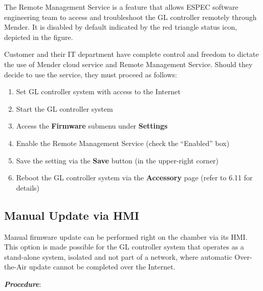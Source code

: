 The Remote Management Service is a feature that allows ESPEC software
engineering team to access and troubleshoot the GL controller remotely
through Mender. It is disabled by default indicated by the red triangle
status icon, depicted in the figure.

Customer and their IT department have complete control and freedom to
dictate the use of Mender cloud service and Remote Management Service.
Should they decide to use the service, they must proceed as follows:

\begin{enumerate}
\def\labelenumi{\arabic{enumi}.}
\tightlist
\item
  Set GL controller system with access to the Internet
\item
  Start the GL controller system
\item
  Access the \textbf{Firmware} submenu under \textbf{Settings}
\item
  Enable the Remote Management Service (check the ``Enabled'' box)
\item
  Save the setting via the \textbf{Save} button (in the upper-right
  corner)
\item
  Reboot the GL controller system via the \textbf{Accessory} page (refer
  to 6.11 for details)
\end{enumerate}


\subsection{Manual Update via
HMI}

Manual firmware update can be performed right on the chamber via its
HMI. This option is made possible for the GL controller system that
operates as a stand-alone system, isolated and not part of a network,
where automatic Over-the-Air update cannot be completed over the
Internet.

\textbf{\emph{Procedure}}:

